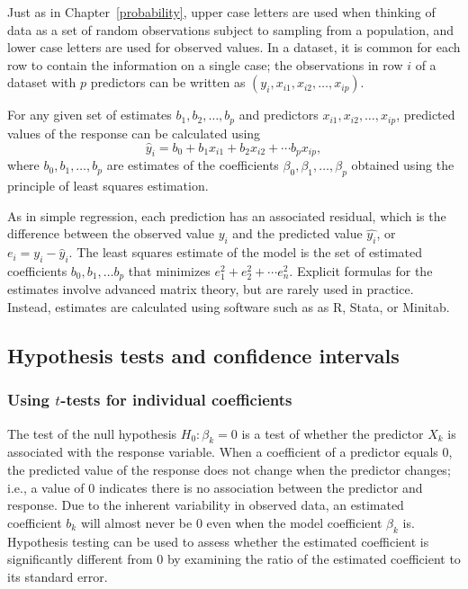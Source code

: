 Just as in Chapter~\ref{probability}, upper case letters are used when thinking of data as a set of random observations subject to sampling from a population, and lower case letters are used for observed values. In a dataset, it is common for each row to contain the information on a single case; the observations in row $i$ of a dataset with $p$ predictors can be written as $(y_i, x_{i1}, x_{i2}, \ldots, x_{ip})$.

For any given set of estimates $b_1, b_2,\ldots,b_p$ and predictors $x_{i1},x_{i2},\ldots,x_{ip}$, predicted values of the response can be calculated using
\[
   \hat{y}_i = b_0 + b_1 x_{i1} + b_2 x_{i2} +\cdots b_p x_{ip},
\]
where $b_0, b_1, \dots, b_p$ are estimates of the coefficients $\beta_0, \beta_1, \dots, \beta_p$ obtained using the principle of least squares estimation. 

As in simple regression, each prediction has an associated residual, which is the difference between the observed value $y_i$ and the predicted value $\hat{y_i}$, or $e_i = y_i - \hat{y}_i$. The least squares estimate of the model is the set of estimated coefficients $b_0, b_1, \ldots b_p$ that minimizes $e_1^2 + e_2^2 + \cdots e_n^2$. Explicit formulas for the estimates involve advanced matrix theory, but are rarely used in practice.  Instead, estimates are calculated using software such as as \textsf{R}, Stata, or Minitab.

\subsection{Hypothesis tests and confidence intervals}

\subsubsection{Using $t$-tests for individual coefficients}

The test of the null hypothesis $H_0: \beta_k = 0$ is a test of whether the predictor $X_k$ is associated with the response variable. When a coefficient of a predictor equals 0, the predicted value of the response does not change when the predictor changes; i.e., a value of 0 indicates there is no association between the predictor and response. Due to the inherent variability in observed data, an estimated coefficient $b_k$ will almost never be 0 even when the model coefficient $\beta_k$ is. Hypothesis testing can be used to assess whether the estimated coefficient is significantly different from 0 by examining the ratio of the estimated coefficient to its standard error.



